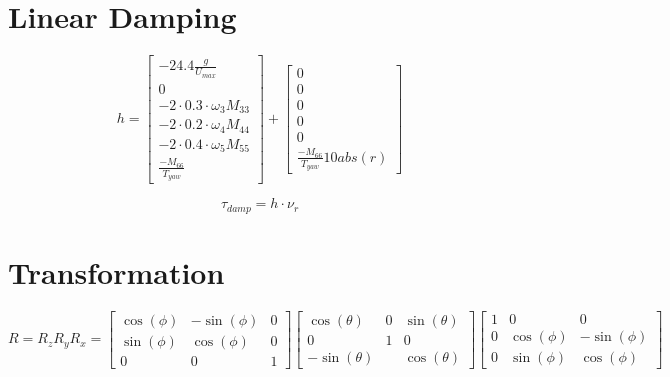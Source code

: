 \documentclass[12pt,a4]{article}
\begin{document}
\section{Linear Damping}
\begin{equation}
	h =
	\begin{bmatrix}
		-24.4 \frac{g}{U_{max}}             \\
		0                                   \\
		-2 \cdot 0.3 \cdot \omega_3  M_{33} \\
		-2 \cdot 0.2 \cdot \omega_4  M_{44} \\
		-2 \cdot 0.4 \cdot \omega_5  M_{55} \\
		\frac{-M_{66}}{T_{yaw}}
	\end{bmatrix} + \begin{bmatrix}0\\0\\0\\0\\0\\  \frac{-M_{66}}{T_{yaw}} 10 abs(r)\end{bmatrix}
\end{equation}

\begin{equation}
	\tau_{damp} = h \cdot \nu_r
\end{equation}

\section{Transformation}
\begin{equation}
	R = R_z R_y R_x =
	\begin{bmatrix}
		\cos(\phi) & -\sin(\phi) & 0 \\
		\sin(\phi) & \cos(\phi)  & 0 \\
		0          & 0           & 1
	\end{bmatrix}
	\begin{bmatrix}
		\cos(\theta)  & 0 & \sin(\theta) \\
		0             & 1 & 0            \\
		-\sin(\theta) &   & \cos(\theta)
	\end{bmatrix}
	\begin{bmatrix}
		1 & 0          & 0           \\
		0 & \cos(\phi) & -\sin(\phi) \\
		0 & \sin(\phi) & \cos(\phi)
	\end{bmatrix}
\end{equation}
\end{document}
